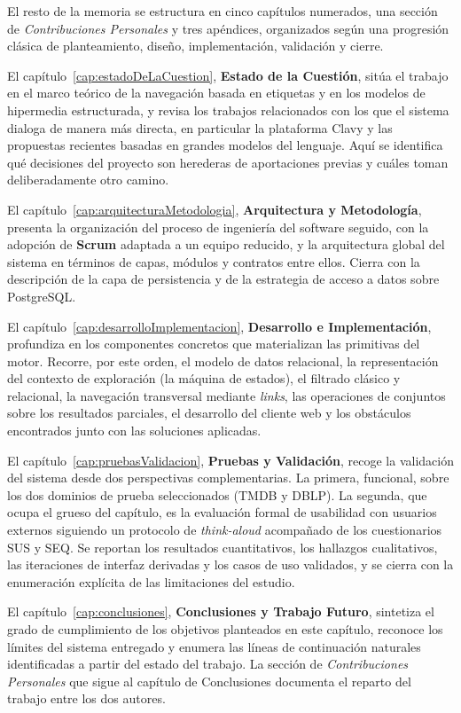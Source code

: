 El resto de la memoria se estructura en cinco capítulos numerados, una sección de
\textit{Contribuciones Personales} y tres apéndices, organizados según una progresión clásica
de planteamiento, diseño, implementación, validación y cierre.

El capítulo~\ref{cap:estadoDeLaCuestion}, \textbf{Estado de la Cuestión}, sitúa el trabajo en el
marco teórico de la navegación basada en etiquetas y en los modelos de hipermedia estructurada,
y revisa los trabajos relacionados con los que el sistema dialoga de manera más directa, en
particular la plataforma Clavy y las propuestas recientes basadas en grandes modelos del
lenguaje. Aquí se identifica qué decisiones del proyecto son herederas de aportaciones previas
y cuáles toman deliberadamente otro camino.

El capítulo~\ref{cap:arquitecturaMetodologia}, \textbf{Arquitectura y Metodología}, presenta
la organización del proceso de ingeniería del software seguido, con la adopción de \textbf{Scrum}
adaptada a un equipo reducido, y la arquitectura global del sistema en términos de capas, módulos
y contratos entre ellos. Cierra con la descripción de la capa de persistencia y de la estrategia
de acceso a datos sobre PostgreSQL.

El capítulo~\ref{cap:desarrolloImplementacion}, \textbf{Desarrollo e Implementación}, profundiza
en los componentes concretos que materializan las primitivas del motor. Recorre, por este orden,
el modelo de datos relacional, la representación del contexto de exploración (la máquina de
estados), el filtrado clásico y relacional, la navegación transversal mediante \textit{links},
las operaciones de conjuntos sobre los resultados parciales, el desarrollo del cliente web y los
obstáculos encontrados junto con las soluciones aplicadas.

El capítulo~\ref{cap:pruebasValidacion}, \textbf{Pruebas y Validación}, recoge la validación del
sistema desde dos perspectivas complementarias. La primera, funcional, sobre los dos dominios de
prueba seleccionados (TMDB y DBLP). La segunda, que ocupa el grueso del capítulo, es la
evaluación formal de usabilidad con usuarios externos siguiendo un protocolo de
\textit{think-aloud} acompañado de los cuestionarios SUS y SEQ. Se reportan los resultados
cuantitativos, los hallazgos cualitativos, las iteraciones de interfaz derivadas y los casos de
uso validados, y se cierra con la enumeración explícita de las limitaciones del estudio.

El capítulo~\ref{cap:conclusiones}, \textbf{Conclusiones y Trabajo Futuro}, sintetiza el grado de
cumplimiento de los objetivos planteados en este capítulo, reconoce los límites del sistema
entregado y enumera las líneas de continuación naturales identificadas a partir del estado
del trabajo. La sección de \textit{Contribuciones Personales} que sigue al capítulo de
Conclusiones documenta el reparto del trabajo entre los dos autores.

